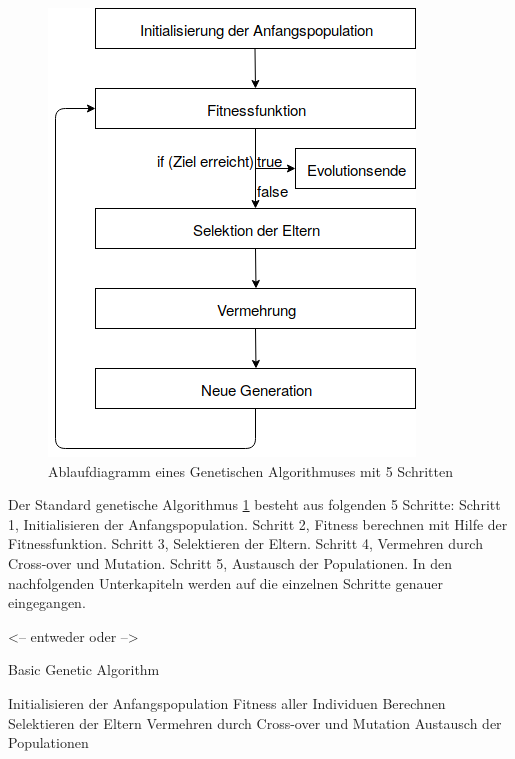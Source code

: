 \noindent%
\begin{figure}[H]
  \centering  
  \includegraphics[scale=0.7]{img/Ablauf_kurz.png}
  \caption{Ablaufdiagramm eines Genetischen Algorithmuses mit 5 Schritten}
  \label{fig:Ablauf_kurz}
\end{figure}


Der Standard genetische Algorithmus \ref{fig:Ablauf_kurz} besteht aus folgenden 5 Schritte:
Schritt 1, Initialisieren der Anfangspopulation.
Schritt 2, Fitness berechnen mit Hilfe der Fitnessfunktion.
Schritt 3, Selektieren der Eltern.
Schritt 4, Vermehren durch Cross-over und Mutation.
Schritt 5, Austausch der Populationen.
In den nachfolgenden Unterkapiteln werden auf die einzelnen Schritte genauer eingegangen.

<--
entweder oder
-->

\begin{algorithm}
\caption{Basic Genetic Algorithm }
\begin{algorithmic}[1]
\State Initialisieren der Anfangspopulation   
	\State Fitness aller Individuen Berechnen
	\State Selektieren der Eltern
	\State Vermehren durch Cross-over und Mutation
	\State Austausch der Populationen
\EndWhile

\label{GA}
\end{algorithmic}
\end{algorithm}



